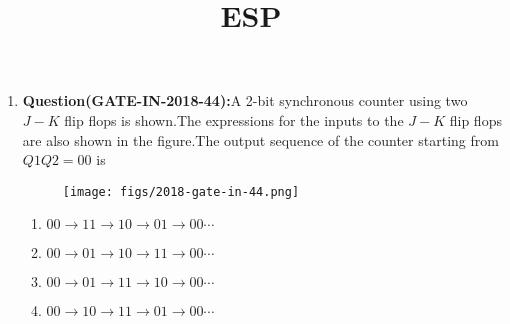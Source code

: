 \documentclass[12pt]{article}
\begin{document}
\title{\textbf{ESP}}
\date{}
\maketitle
\begin{enumerate}
    \item \textbf{Question(GATE-IN-2018-44):}A 2-bit synchronous counter using two $J-K$ flip flops is shown.The expressions for the inputs to the $J-K$ flip flops are also shown in the figure.The output sequence of the counter starting
from $Q1Q2=00$ is
 \begin{figure}[!h]
        \centering
        \texttt{[image: figs/2018-gate-in-44.png]}
        \caption{}
        \label{fig:2018-gate-in-44}
    \end{figure}

    \begin{enumerate}
    \item $00\rightarrow 11\rightarrow 10\rightarrow 01\rightarrow 00\cdots$
\item $00\rightarrow 01\rightarrow 10\rightarrow 11\rightarrow 00\cdots$ 
\item $00\rightarrow 01\rightarrow 11\rightarrow 10\rightarrow 00\cdots$
\item $00\rightarrow 10\rightarrow 11\rightarrow 01\rightarrow 00\cdots$
    \end{enumerate}


\end{enumerate}
\end{document}

